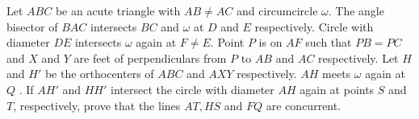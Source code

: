 Let $ABC$ be an acute triangle with $AB\ne AC$ and circumcircle $\omega$. The angle bisector of $BAC$ intersects $BC$ and $\omega$ at $D$ and $E$ respectively. Circle with diameter $DE$ intersects $\omega$ again at $F \ne E$. Point $P$ is on $AF$ such that $PB = PC$ and $X$ and $Y$ are feet of perpendiculars from $P$ to $AB$ and $AC$ respectively. Let $H$ and $H'$ be the orthocenters of $ABC$ and $AXY$ respectively. $AH$ meets $\omega$ again at $Q$ . If $AH'$ and $HH'$ intersect the circle with diameter $AH$ again at points $S$ and $T$,  respectively, prove that the lines $AT , HS$ and $FQ$ are concurrent.